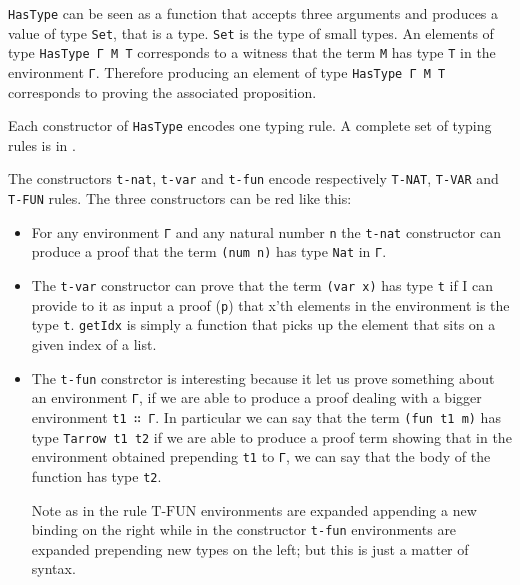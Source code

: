 \documentclass{article}
\begin{document}
\texttt{HasType} can be seen as a function that accepts three arguments and produces a value of type \texttt{Set}, that is a type.
\texttt{Set} is the type of small types.
An elements of type \texttt{HasType Γ M T} corresponds to a witness that the term \texttt{M} has type \texttt{T} in the environment \texttt{Γ}.
Therefore producing an element of type \texttt{HasType Γ M T} corresponds to proving the associated proposition.

Each constructor of \texttt{HasType} encodes one typing rule.
A complete set of typing rules is in \cite[p.\ 15]{crafa}.

The constructors \texttt{t-nat}, \texttt{t-var} and \texttt{t-fun} encode respectively \texttt{T-NAT}, \texttt{T-VAR} and \texttt{T-FUN} rules.
The three constructors can be red like this:
\begin{itemize}

\item For any environment \texttt{Γ} and any natural number \texttt{n} the \texttt{t-nat} constructor can produce a proof that the term \texttt{(num n)} has type \texttt{Nat} in \texttt{Γ}.

\item The \texttt{t-var} constructor can prove that the term \texttt{(var x)} has type \texttt{t} if I can provide to it as input a proof (\texttt{p}) that x'th elements in the environment is the type \texttt{t}.
\texttt{getIdx} is simply a function that picks up the element that sits on a given index of a list.

\item The \texttt{t-fun} constrctor is interesting because it let us prove something about an environment \texttt{Γ}, if we are able to produce a proof dealing with a bigger environment \texttt{t1 ∷ Γ}.
In particular we can say that the term \texttt{(fun t1 m)} has type \texttt{Tarrow t1 t2} if we are able to produce a proof term showing that in the environment obtained prepending \texttt{t1} to \texttt{Γ}, we can say that the body of the function has type \texttt{t2}.

Note as in the rule $\text{T-FUN}$ environments are expanded appending a new binding on the right while in the constructor \texttt{t-fun} environments are expanded prepending new types on the left; but this is just a matter of syntax.

\end{itemize}

\end{document}
